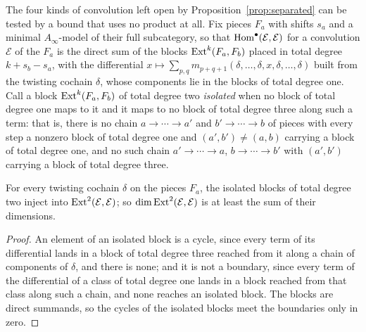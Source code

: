 The four kinds of convolution left open by Proposition~\ref{prop:separated} can be tested by a bound that uses no product at all. Fix pieces $F_{a}$ with shifts $s_{a}$ and a minimal $A_{\infty}$-model of their full subcategory, so that $\mathrm{Hom}^{\bullet}(\mathcal{E},\mathcal{E})$ for a convolution $\mathcal{E}$ of the $F_{a}$ is the direct sum of the blocks $\mathrm{Ext}^{k}(F_{a},F_{b})$ placed in total degree $k+s_{b}-s_{a}$, with the differential $x\mapsto\sum_{p,q}m_{p+q+1}(\delta,\dots,\delta,x,\delta,\dots,\delta)$ built from the twisting cochain $\delta$, whose components lie in the blocks of total degree one. Call a block $\mathrm{Ext}^{k}(F_{a},F_{b})$ of total degree two \emph{isolated} when no block of total degree one maps to it and it maps to no block of total degree three along such a term: that is, there is no chain $a\to\cdots\to a'$ and $b'\to\cdots\to b$ of pieces with every step a nonzero block of total degree one and $(a',b')\ne(a,b)$ carrying a block of total degree one, and no such chain $a'\to\cdots\to a$, $b\to\cdots\to b'$ with $(a',b')$ carrying a block of total degree three.

\begin{lemma}\label{lem:isolated}
For every twisting cochain $\delta$ on the pieces $F_{a}$, the isolated blocks of total degree two inject into $\mathrm{Ext}^{2}(\mathcal{E},\mathcal{E})$; so $\dim\mathrm{Ext}^{2}(\mathcal{E},\mathcal{E})$ is at least the sum of their dimensions.
\end{lemma}

\begin{proof}
An element of an isolated block is a cycle, since every term of its differential lands in a block of total degree three reached from it along a chain of components of $\delta$, and there is none; and it is not a boundary, since every term of the differential of a class of total degree one lands in a block reached from that class along such a chain, and none reaches an isolated block. The blocks are direct summands, so the cycles of the isolated blocks meet the boundaries only in zero.
\end{proof}

